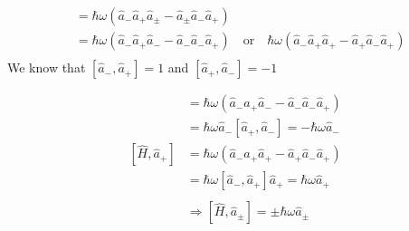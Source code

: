 \documentclass{article}
\begin{document}
\begin{enumerate}[label=(\alph*)]
\begin{align*}
		                             & = \hbar \omega (\hat{a}_- \hat{a}_+ \hat{a}_\pm - \hat{a}_\pm \hat{a}_- \hat{a}_+ )                                                                                                  \\
		                             & = \hbar \omega (\hat{a}_- \hat{a}_+ \hat{a}_- - \hat{a}_- \hat{a}_- \hat{a}_+ ) \quad \text{or} \quad  \hbar \omega (\hat{a}_- \hat{a}_+ \hat{a}_+ - \hat{a}_+ \hat{a}_- \hat{a}_+ ) \\
	      \end{align*}
	      We know that \([\hat{a}_- , \hat{a}_+] = 1\) and \([\hat{a}_+ , \hat{a}_-] = -1\)

	      \begin{align*}
		      [\hat{H}, \hat{a}_-] & = \hbar \omega (\hat{a}_- \hat{a}_+ \hat{a}_- - \hat{a}_- \hat{a}_- \hat{a}_+ ) \\
		                           & = \hbar \omega \hat{a}_- [\hat{a}_+ , \hat{a}_-] = -\hbar \omega \hat{a}_-      \\
		      [\hat{H}, \hat{a}_+] & = \hbar \omega (\hat{a}_- \hat{a}_+ \hat{a}_+ - \hat{a}_+ \hat{a}_- \hat{a}_+ ) \\
		                           & = \hbar \omega [\hat{a}_- , \hat{a}_+] \hat{a}_+ = \hbar \omega \hat{a}_+       \\ \\
		                           & \Rightarrow [\hat{H}, \hat{a}_\pm] = \pm \hbar \omega \hat{a}_\pm
	      \end{align*}
\end{enumerate}
\end{document}

